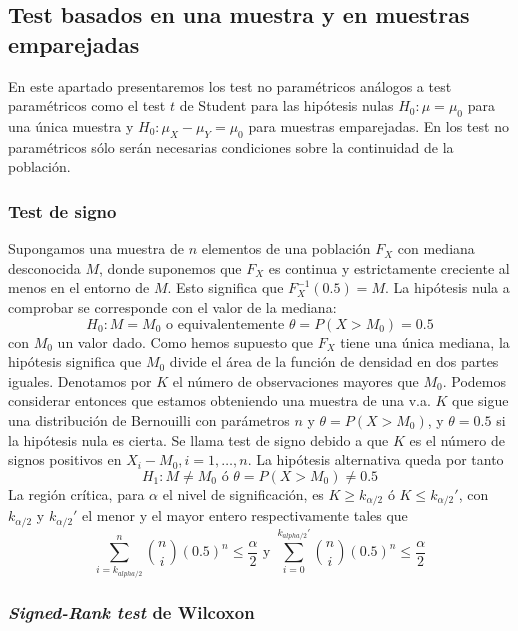 \subsection{Test basados en una muestra y en muestras emparejadas}
	
	En este apartado presentaremos los test no paramétricos análogos a test paramétricos como el test $t$ de Student para las hipótesis nulas $H_0: \mu = \mu_0$ para una única muestra y $H_0: \mu_X - \mu_Y = \mu_0$ para muestras emparejadas. En los test no paramétricos sólo serán necesarias condiciones sobre la continuidad de la población. 
	
\subsubsection{Test de signo}

	Supongamos una muestra de $n$ elementos de una población $F_X$ con mediana desconocida $M$, donde suponemos que $F_X$ es continua y estrictamente creciente al menos en el entorno de $M$. Esto significa que $F_X^{-1}(0.5) = M$. La hipótesis nula a comprobar se corresponde con el valor de la mediana:
	\[ H_0: M = M_0	\text{ o equivalentemente }
			\theta = P(X > M_0) = 0.5 \]
	con $M_0$ un valor dado. Como hemos supuesto que $F_X$ tiene una única mediana, la hipótesis significa que $M_0$ divide el área de la función de densidad en dos partes iguales. Denotamos por $K$ el número de observaciones mayores que $M_0$. Podemos considerar entonces que estamos obteniendo una muestra de una v.a. $K$ que sigue una distribución de Bernouilli con parámetros $n$ y $\theta=P(X>M_0)$, y $\theta=0.5$ si la hipótesis nula es cierta. Se llama test de signo debido a que $K$ es el número de signos positivos en $X_i - M_0, i = 1, \dots, n$. La hipótesis alternativa queda por tanto
	\[ H_1: M \neq M_0	\text{ ó }
			\theta = P(X > M_0) \neq 0.5 \]
	La región crítica, para $\alpha$ el nivel de significación, es $K \geq k_{\alpha/2}$ ó $K \leq k_{\alpha/2}'$, con $k_{\alpha/2}$ y $k_{\alpha/2}'$ el menor y el mayor entero respectivamente tales que
	\[ \sum\limits_{i=k_{alpha/2}}^n
			{n \choose i}(0.5)^n \leq \frac{\alpha}{2}
		\text{ y }
		\sum\limits_{i=0}^{k_{alpha/2}'}
			{n \choose i}(0.5)^n \leq \frac{\alpha}{2}
	\]

\subsubsection{\textit{Signed-Rank test} de Wilcoxon}


